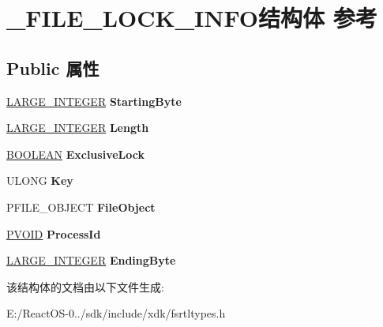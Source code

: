 \hypertarget{struct___f_i_l_e___l_o_c_k___i_n_f_o}{}\section{\+\_\+\+F\+I\+L\+E\+\_\+\+L\+O\+C\+K\+\_\+\+I\+N\+F\+O结构体 参考}
\label{struct___f_i_l_e___l_o_c_k___i_n_f_o}
\subsection*{Public 属性}
\begin{DoxyCompactItemize}
\item 
\mbox{\label{struct___f_i_l_e___l_o_c_k___i_n_f_o_a6890a501504a87a75866e2e9de2a9b32}} 
\hyperlink{union___l_a_r_g_e___i_n_t_e_g_e_r}{L\+A\+R\+G\+E\+\_\+\+I\+N\+T\+E\+G\+ER} {\bfseries Starting\+Byte}
\item 
\mbox{\label{struct___f_i_l_e___l_o_c_k___i_n_f_o_a90927fd72c999bed681c9f9426753c04}} 
\hyperlink{union___l_a_r_g_e___i_n_t_e_g_e_r}{L\+A\+R\+G\+E\+\_\+\+I\+N\+T\+E\+G\+ER} {\bfseries Length}
\item 
\mbox{\label{struct___f_i_l_e___l_o_c_k___i_n_f_o_a39d3dbc2f8c773afd22b2c00e8fa3b92}} 
\hyperlink{_processor_bind_8h_a112e3146cb38b6ee95e64d85842e380a}{B\+O\+O\+L\+E\+AN} {\bfseries Exclusive\+Lock}
\item 
\mbox{\label{struct___f_i_l_e___l_o_c_k___i_n_f_o_ae679ca0d3a0a844f4aaeb174dcdfe631}} 
U\+L\+O\+NG {\bfseries Key}
\item 
\mbox{\label{struct___f_i_l_e___l_o_c_k___i_n_f_o_a9f3abee38bea5bf30d7e57eb1e22e4a3}} 
P\+F\+I\+L\+E\+\_\+\+O\+B\+J\+E\+CT {\bfseries File\+Object}
\item 
\mbox{\label{struct___f_i_l_e___l_o_c_k___i_n_f_o_a0134648dbdfc9bde653584d55b9e8264}} 
\hyperlink{interfacevoid}{P\+V\+O\+ID} {\bfseries Process\+Id}
\item 
\mbox{\label{struct___f_i_l_e___l_o_c_k___i_n_f_o_a50cd1de199c66f0fc89530d965094d9e}} 
\hyperlink{union___l_a_r_g_e___i_n_t_e_g_e_r}{L\+A\+R\+G\+E\+\_\+\+I\+N\+T\+E\+G\+ER} {\bfseries Ending\+Byte}
\end{DoxyCompactItemize}


该结构体的文档由以下文件生成\+:\begin{DoxyCompactItemize}
\item 
E\+:/\+React\+O\+S-\/0../sdk/include/xdk/fsrtltypes.\+h\end{DoxyCompactItemize}
